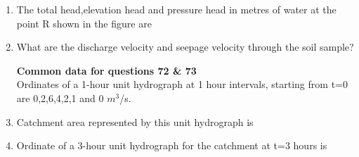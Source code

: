 \documentclass[journal]{IEEEtran}
\begin{document}
\begin {enumerate}[start=70]
\item %
The total head,elevation head and pressure head in metres of water at the point R shown in the figure are
\begin{enumerate}
\end{enumerate}

\item %
What are the discharge velocity and seepage velocity through the soil sample?
\begin{enumerate}
\end{enumerate}


\textbf{Common data for questions 72 \& 73} \\
Ordinates of a 1-hour unit hydrograph at 1 hour intervals, starting from t=0 are 0,2,6,4,2,1 and 0 $m^3$/s.

\item %
Catchment area represented by this unit hydrograph is 
\begin{enumerate}
\end{enumerate}

\item %
Ordinate of a 3-hour unit hydrograph for the catchment at t=3 hours is 
\begin{enumerate}
\end{enumerate}
\end{enumerate}
\end{document}
